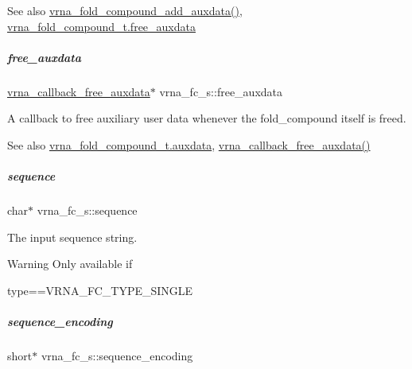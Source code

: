 \begin{DoxySeeAlso}{See also}
\hyperlink{group__fold__compound_ga6316a9426bea2f742375e8df6febd3f6}{vrna\+\_\+fold\+\_\+compound\+\_\+add\+\_\+auxdata()}, \hyperlink{group__fold__compound_a8e84dbabab016ecd74da6c38cb94e816}{vrna\+\_\+fold\+\_\+compound\+\_\+t.\+free\+\_\+auxdata} 
\end{DoxySeeAlso}
\mbox{\label{group__fold__compound_a8e84dbabab016ecd74da6c38cb94e816}} 
\subparagraph{\texorpdfstring{free\+\_\+auxdata}{free\_auxdata}}
{\footnotesize\ttfamily \hyperlink{group__fold__compound_ga7806651f51b195013839a218b3bbd5a3}{vrna\+\_\+callback\+\_\+free\+\_\+auxdata}$\ast$ vrna\+\_\+fc\+\_\+s\+::free\+\_\+auxdata}



A callback to free auxiliary user data whenever the fold\+\_\+compound itself is free\textquotesingle{}d. 

\begin{DoxySeeAlso}{See also}
\hyperlink{group__fold__compound_a20048e0c369e9f24b55423d600037c68}{vrna\+\_\+fold\+\_\+compound\+\_\+t.\+auxdata}, \hyperlink{group__fold__compound_ga7806651f51b195013839a218b3bbd5a3}{vrna\+\_\+callback\+\_\+free\+\_\+auxdata()} 
\end{DoxySeeAlso}
\mbox{\label{group__fold__compound_a87f6abcda89cfb7a486c97e1f5371525}} 
\subparagraph{\texorpdfstring{sequence}{sequence}}
{\footnotesize\ttfamily char$\ast$ vrna\+\_\+fc\+\_\+s\+::sequence}



The input sequence string. 

\begin{DoxyWarning}{Warning}
Only available if\begin{DoxyVerb}type==VRNA_FC_TYPE_SINGLE \end{DoxyVerb}
 
\end{DoxyWarning}
\mbox{\label{group__fold__compound_a9934bdb695d35a3544285cbcc19f9763}} 
\subparagraph{\texorpdfstring{sequence\+\_\+encoding}{sequence\_encoding}}
{\footnotesize\ttfamily short$\ast$ vrna\+\_\+fc\+\_\+s\+::sequence\+\_\+encoding}



